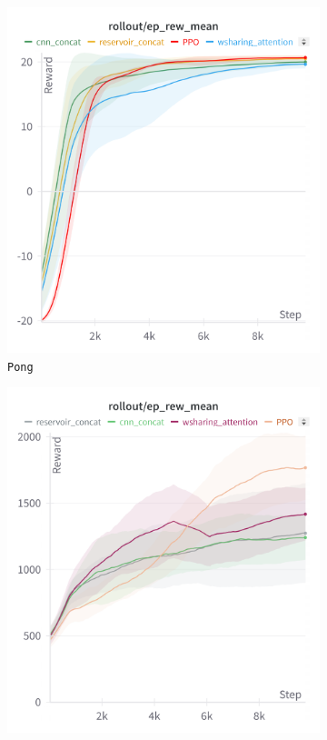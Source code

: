 \begin{figure}[ht]
    \centering
    \begin{subfigure}[b]{0.32\textwidth}
        \centering
        \includegraphics[width=\textwidth]{images/pong_train.png}
        \caption{\texttt{Pong}}
        \label{fig:pongtraining}
    \end{subfigure}
    \hfill
    \begin{subfigure}[b]{0.32\textwidth}
        \centering
        \includegraphics[width=\textwidth]{images/mspacman_train.png}

\end{subfigure}
\end{figure}
